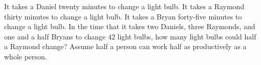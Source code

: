 It takes a Daniel twenty minutes to change a light bulb. It takes a Raymond thirty minutes to change a light bulb. It takes a Bryan forty-five minutes to change a light bulb. In the time that it takes two Daniels, three Raymonds, and one and a half Bryans to change $42$ light bulbs, how many light bulbs could half a Raymond change? Assume half a person can work half as productively as a whole person.

